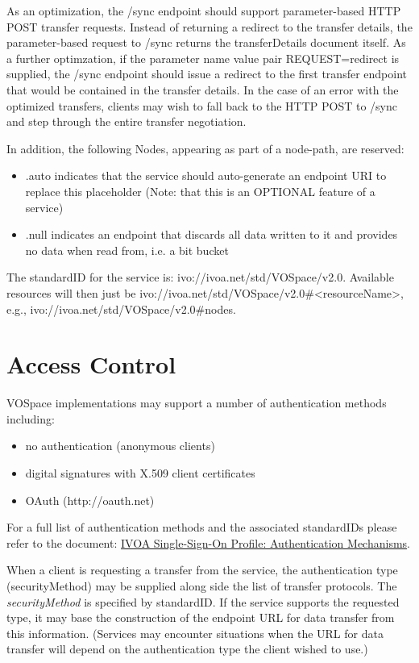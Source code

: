 \documentclass[11pt,a4paper]{ivoa}
\begin{document}
As an optimization, the /sync endpoint should support parameter-based HTTP POST transfer requests. Instead of returning a redirect to the transfer details, the parameter-based request to /sync returns the transferDetails document itself. As a further optimzation, if the parameter name value pair REQUEST=redirect is supplied, the /sync endpoint should issue a redirect to the first transfer endpoint that would be contained in the transfer details. In the case of an error with the optimized transfers, clients may wish to fall back to the HTTP POST to /sync and step through the entire transfer negotiation.

In addition, the following Nodes, appearing as part of a node-path, are reserved:

\begin{itemize}
    \item .auto indicates that the service should auto-generate an endpoint URI to replace this placeholder (Note: that this is an OPTIONAL feature of a service)
    \item .null indicates an endpoint that discards all data written to it and provides no data when read from, i.e. a bit bucket
\end{itemize}

The standardID for the service is: ivo://ivoa.net/std/VOSpace/v2.0. Available resources will then just be ivo://ivoa.net/std/VOSpace/v2.0\#<resourceName>, e.g., ivo://ivoa.net/std/VOSpace/v2.0\#nodes.

\section{Access Control}
\label{sec:access control}
VOSpace implementations may support a number of authentication methods including:

\begin{itemize}
    \item no authentication (anonymous clients)
    \item digital signatures with X.509 client certificates
    \item OAuth (http://oauth.net)
\end{itemize}

For a full list of authentication methods and the associated standardIDs please refer to the document: \href{http://www.ivoa.net/documents/latest/SSOAuthMech.html}{IVOA Single-Sign-On Profile: Authentication Mechanisms}. 	

When a client is requesting a transfer from the service, the authentication type (securityMethod) may be supplied along side the list of transfer protocols. The \emph{securityMethod} is specified by standardID.  If the service supports the requested type, it may base the construction of the endpoint URL for data transfer from this information.  (Services may encounter situations when the URL for data transfer will depend on the authentication type the client wished to use.)
\end{document}
